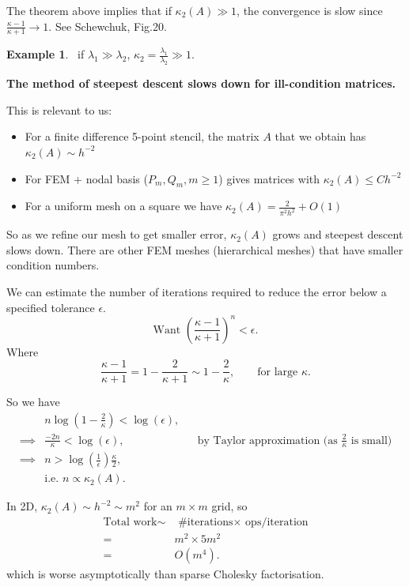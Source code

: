 \documentclass[12pt, a4paper]{article}
\theoremstyle{definition}
\newtheorem{example}[thm]{Example}
\theoremstyle{remark}
\numberwithin{equation}{section}
\begin{document}
The theorem above implies that if $\kappa_2(A)\gg 1$, the convergence is slow since $\frac{\kappa-1}{\kappa+1} \rightarrow 1$.
 See Schewchuk, Fig.20.


\begin{example}
\ if $\lambda_1 \gg \lambda_2$, $\kappa_2 = \frac{\lambda_1}{\lambda_2} \gg 1$.
\end{example}

{\bf The method of steepest descent slows down for ill-condition matrices.}
 
 \newpage
This is relevant to us: 
\begin{itemize}
\item For a finite difference  5-point stencil, the matrix $A$ that we obtain has $\kappa_2(A) \sim h^{-2}$
\item For FEM + nodal basis ($P_m, Q_m, m \ge 1$) gives matrices with $\kappa_2(A) \le C h^{-2}$
\item For a uniform mesh on a square we have $\kappa_2(A) = \frac{2}{\pi^2h^2}+O(1)$
\end{itemize}
So as we refine our mesh to get smaller error, $\kappa_2(A)$ grows and steepest descent slows down.
There are other FEM meshes (hierarchical meshes) that have smaller condition numbers. 

We can estimate the number of iterations required to reduce the error below a specified tolerance $\epsilon$.
\begin{equation*}
\mbox{Want } \left( \frac{\kappa -1}{\kappa+1} \right)^n < \epsilon.
\end{equation*}
Where
\begin{equation*}
\frac{\kappa-1}{\kappa+1}=1-\frac{2}{\kappa+1} \sim 1- \frac{2}{\kappa}, \qquad \mbox{for large $\kappa$}.
\end{equation*}

So we have
\begin{align*}
&n\log\left(1-\frac{2}{\kappa}\right) < \log(\epsilon),\\
\implies &\frac{-2n}{\kappa} < \log(\epsilon), &&\mbox{by  Taylor approximation (as $\frac{2}{\kappa}$ is small)}\\
\implies &n > \log\left(\frac{1}{\epsilon}\right) \frac{\kappa}{2},\\
& \mbox{i.e. } n \propto \kappa_2(A).
\end{align*}

In 2D, $\kappa_2(A) \sim h^{-2} \sim m^2$ for an $m  \times m$ grid,
so \begin{align*}
\mbox{Total work} \sim& \mbox{ \#iterations} \times \mbox{ ops/iteration}\\
=&m^2 \times 5m^2\\
=&O(m^4).
\end{align*}
which is worse asymptotically than sparse Cholesky factorisation. 
\end{document}
